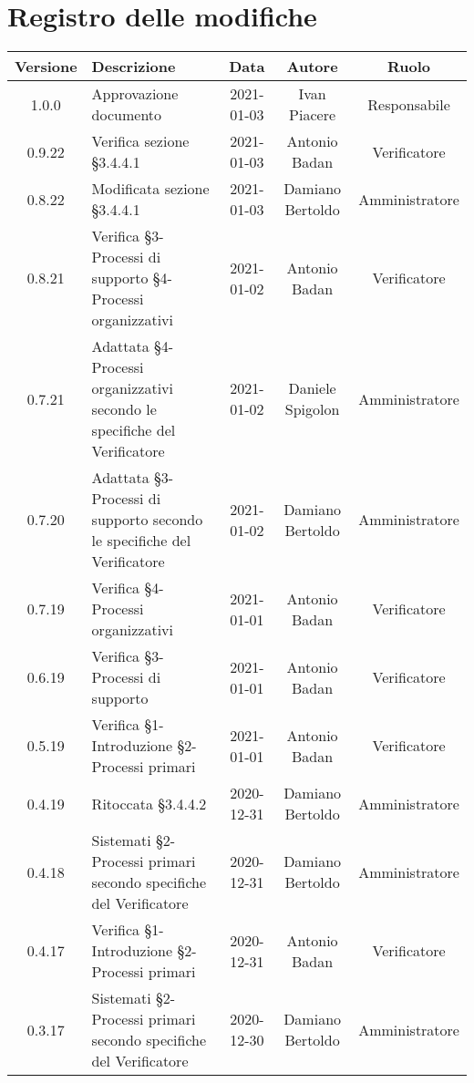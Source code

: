 \section*{Registro delle modifiche}

\begin{center}
	\begin{longtable}{|c|p{5cm}|c|c|c|}
	\hline
	\rowcolor{lighter-grayer}
	\textbf{Versione} & \textbf{Descrizione} & \textbf{Data} & \textbf{Autore} & \textbf{Ruolo} \\
	\hline
	\endfirsthead

	1.0.0 & Approvazione documento & 2021-01-03 & Ivan Piacere & Responsabile \\
	\hline
	0.9.22 & Verifica sezione §3.4.4.1  & 2021-01-03 & Antonio Badan & Verificatore \\
	\hline
	0.8.22 & Modificata sezione §3.4.4.1  & 2021-01-03 & Damiano Bertoldo & Amministratore \\
	\hline
	0.8.21 & Verifica §3-Processi di supporto §4-Processi organizzativi  & 2021-01-02 & Antonio Badan & Verificatore \\
	\hline
	0.7.21 & Adattata §4-Processi organizzativi secondo le specifiche del Verificatore & 2021-01-02 & Daniele Spigolon & Amministratore \\
	\hline
	0.7.20 & Adattata §3-Processi di supporto secondo le specifiche del Verificatore & 2021-01-02 & Damiano Bertoldo & Amministratore \\
	\hline
	0.7.19 & Verifica §4-Processi organizzativi & 2021-01-01 & Antonio Badan & Verificatore \\
	\hline
	0.6.19 & Verifica §3-Processi di supporto & 2021-01-01 & Antonio Badan & Verificatore \\
	\hline
	0.5.19 & Verifica §1-Introduzione §2-Processi primari & 2021-01-01 & Antonio Badan & Verificatore \\
	\hline
	0.4.19 & Ritoccata §3.4.4.2 & 2020-12-31 & Damiano Bertoldo & Amministratore \\
	\hline
	0.4.18 & Sistemati §2-Processi primari secondo specifiche del Verificatore & 2020-12-31 & Damiano Bertoldo & Amministratore \\
	\hline
	0.4.17 & Verifica §1-Introduzione §2-Processi primari & 2020-12-31 & Antonio Badan & Verificatore \\
	\hline
	0.3.17 & Sistemati §2-Processi primari secondo specifiche del Verificatore  & 2020-12-30 & Damiano Bertoldo & Amministratore \\

\end{longtable}
\end{center}
